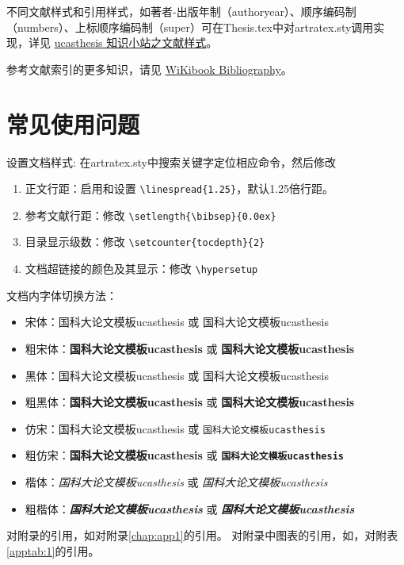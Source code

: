 不同文献样式和引用样式，如著者-出版年制（authoryear）、顺序编码制（numbers）、上标顺序编码制（super）可在Thesis.tex中对artratex.sty调用实现，详见 \href{https://github.com/mohuangrui/ucasthesis/wiki}{ucasthesis 知识小站之文献样式}。


参考文献索引的更多知识，请见 \href{https://en.wikibooks.org/wiki/LaTeX/Bibliography_Management}{WiKibook Bibliography}。\nocite{*}%

\section{常见使用问题}\label{sec:qa}

设置文档样式: 在artratex.sty中搜索关键字定位相应命令，然后修改
\begin{enumerate}
    \item 正文行距：启用和设置 \verb|\linespread{1.25}|，默认1.25倍行距。
    \item 参考文献行距：修改 \verb|\setlength{\bibsep}{0.0ex}|
    \item 目录显示级数：修改 \verb|\setcounter{tocdepth}{2}|
    \item 文档超链接的颜色及其显示：修改 \verb|\hypersetup|
\end{enumerate}

文档内字体切换方法：
    \begin{itemize}
        \item 宋体：国科大论文模板ucasthesis 或 \textrm{国科大论文模板ucasthesis}
        \item 粗宋体：{\bfseries 国科大论文模板ucasthesis} 或 \textbf{国科大论文模板ucasthesis}
        \item 黑体：{\sffamily 国科大论文模板ucasthesis} 或 \textsf{国科大论文模板ucasthesis}
        \item 粗黑体：{\bfseries\sffamily 国科大论文模板ucasthesis} 或 \textsf{\bfseries 国科大论文模板ucasthesis}
        \item 仿宋：{\ttfamily 国科大论文模板ucasthesis} 或 \texttt{国科大论文模板ucasthesis}
        \item 粗仿宋：{\bfseries\ttfamily 国科大论文模板ucasthesis} 或 \texttt{\bfseries 国科大论文模板ucasthesis}
        \item 楷体：{\itshape 国科大论文模板ucasthesis} 或 \textit{国科大论文模板ucasthesis}
        \item 粗楷体：{\bfseries\itshape 国科大论文模板ucasthesis} 或 \textit{\bfseries 国科大论文模板ucasthesis}
    \end{itemize}
    
对附录的引用，如对附录\ref{chap:app1}的引用。
对附录中图表的引用，如，对附表\ref{apptab:1}的引用。
